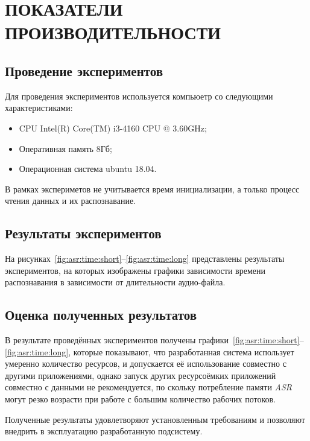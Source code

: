 \chapter{ПОКАЗАТЕЛИ ПРОИЗВОДИТЕЛЬНОСТИ}

\section{Проведение экспериментов}
Для проведения экспериментов используется компьюетр со следующими характеристиками:
\begin{itemize}
    \item CPU Intel(R) Core(TM) i3-4160 CPU @ 3.60GHz;
    \item Оперативная память 8Гб;
    \item Операционная система ubuntu 18.04.
\end{itemize}

В рамках экспериметов не учитывается время инициализации, а только
процесс чтения данных и их распознавание.

\section{Результаты экспериментов}
На рисунках~\ref{fig:asr:time:short}--\ref{fig:asr:time:long} представлены
результаты экспериментов, на которых изображены графики зависимости времени
распознавания в зависимости от длительности аудио-файла.


\section{Оценка полученных результатов}
В результате проведённых экспериментов получены графики~\ref{fig:asr:time:short}--\ref{fig:asr:time:long},
которые показывают, что разработанная система использует умеренно количество
ресурсов, и допускается её использование совместно с другими приложениями,
однако запуск других ресурсоёмких приложений совместно с данными не рекомендуется,
по скольку потребление памяти \textit{ASR} могут резко возрасти при работе
с большим количество рабочих потоков.

Полученные результаты удовлетворяют установленным требованиям и позволяют
внедрить в эксплуатацию разработанную подсистему.
